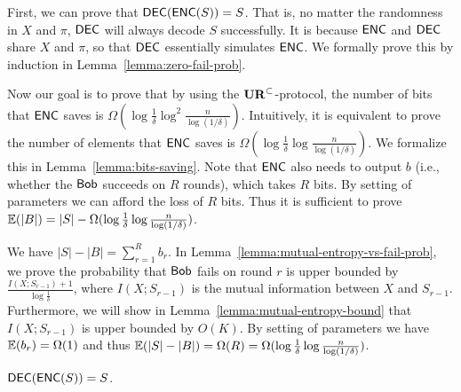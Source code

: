 First, we can prove that $\textsf{DEC}(\textsf{ENC}(S))=S$. 
That is, no matter the randomness in $X$ and $\pi$, $\textsf{DEC}$ will always decode $S$ successfully. 
It is because $\textsf{ENC}$ and $\textsf{DEC}$ share $X$ and $\pi$, so that $\textsf{DEC}$ essentially simulates $\textsf{ENC}$. 
We formally prove this by induction in Lemma~\ref{lemma:zero-fail-prob}. 

Now our goal is to prove that by using the $\mathbf{UR}^\subset$-protocol, the number of bits that $\textsf{ENC}$ saves is $\Omega(\log \frac{1}{\delta}\log^2 \frac{n}{\log (1/\delta)} )$. 
Intuitively, it is equivalent to prove the number of elements that $\textsf{ENC}$ saves is $\Omega(\log \frac{1}{\delta}\log \frac{n}{\log (1/\delta)} )$.
We formalize this in Lemma~\ref{lemma:bits-saving}. 
Note that $\textsf{ENC}$ also needs to output $b$ (i.e., whether the $\mathsf{Bob}$ succeeds on $R$ rounds), which takes $R$ bits. 
By setting of parameters we can afford the loss of $R$ bits. 
Thus it is sufficient to prove $\operatorname*{\mathbb{E}}(|B|)=|S|-\Omega(\log \frac{1}{\delta}\log \frac{n}{\log (1/\delta)})$. 

We have $|S|-|B|=\sum_{r=1}^{R}b_r$. 
In Lemma~\ref{lemma:mutual-entropy-vs-fail-prob}, we prove the probability that $\mathsf{Bob}$ fails on round $r$ is upper bounded by $\frac{I(X;S_{r-1})+1}{\log \frac{1}{\delta}}$, where $I(X;S_{r-1})$ is the mutual information between $X$ and $S_{r-1}$. 
Furthermore, we will show in Lemma~\ref{lemma:mutual-entropy-bound} that $I(X;S_{r-1})$ is upper bounded by $O(K)$.
By setting of parameters we have $\operatorname*{\mathbb{E}}(b_r)=\Omega(1)$ and thus $\operatorname*{\mathbb{E}}(|S|-|B|)=\Omega(R)=\Omega(\log \frac{1}{\delta}\log \frac{n}{\log (1/\delta)})$.
 
\begin{lemma}\label{lemma:zero-fail-prob}
  $\textsf{DEC}(\textsf{ENC}(S))=S$.
\end{lemma}

